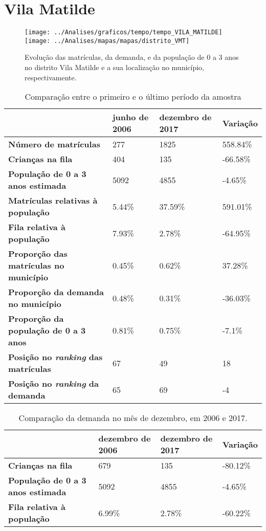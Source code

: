 \section{Vila Matilde}
\begin{figure}[H]
	\centering
	\texttt{[image: ../Analises/graficos/tempo/tempo\_VILA\_MATILDE]}
	\texttt{[image: ../Analises/mapas/mapas/distrito\_VMT]}
	\caption{Evolução das matrículas, da demanda, e da população de 0 a 3 anos no distrito Vila Matilde e a sua localização no município, respectivamente.}
\end{figure}
\begin{table}[H]
	\begin{tabular}{|l|l|l|l|}
		\hline
		\textbf{}                                      & \textbf{junho de 2006}       & \textbf{dezembro de 2017}    & \textbf{Variação} \\ \hline
		\textbf{Número de matrículas}                  & 277 & 1825 & 558.84\% \\ \hline
		\textbf{Crianças na fila}                      & 404 & 135 & -66.58\% \\ \hline
		\textbf{População de 0 a 3 anos estimada}      & 5092 & 4855 & -4.65\% \\ \hline
		\textbf{Matrículas relativas à população}      & 5.44\% & 37.59\% & 591.01\% \\ \hline
		\textbf{Fila relativa à população}             & 7.93\% & 2.78\% & -64.95\% \\ \hline
		\textbf{Proporção das matrículas no município} & 0.45\% & 0.62\% & 37.28\% \\ \hline
		\textbf{Proporção da demanda no município}     & 0.48\% & 0.31\% & -36.03\% \\ \hline
		\textbf{Proporção da população de 0 a 3 anos}  & 0.81\% & 0.75\% & -7.1\% \\ \hline
		\textbf{Posição no \textit{ranking} das matrículas}     & 67 & 49 & 18 \\ \hline
		\textbf{Posição no \textit{ranking} da demanda}         & 65 & 69 & -4 \\ \hline
	\end{tabular}
	\caption{Comparação entre o primeiro e o último período da amostra}
\end{table}
\begin{table}[H]
	\begin{tabular}{|l|l|l|l|}
		\hline
		\textbf{}                                 & \textbf{dezembro de 2006} & \textbf{dezembro de 2017} & \textbf{Variação} \\ \hline
		\textbf{Crianças na fila}                      & 679 & 135 & -80.12\% \\ \hline
		\textbf{População de 0 a 3 anos estimada}      & 5092 & 4855 & -4.65\% \\ \hline
		\textbf{Fila relativa à população}             & 6.99\% & 2.78\% & -60.22\% \\ \hline
	\end{tabular}
	\caption{Comparação da demanda no mês de dezembro, em 2006 e 2017.}
\end{table}
